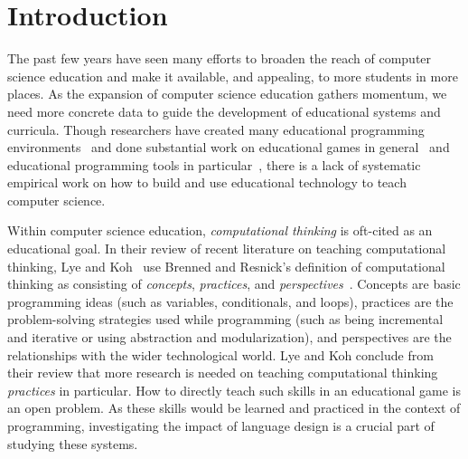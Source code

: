 \documentclass{sig-alternate}
\begin{document}



\section{Introduction}

The past few years have seen many efforts to broaden the reach of computer science education and make it available, and appealing, to more students in more places. As the expansion of computer science education gathers momentum, we need more concrete data to guide the development of educational systems and curricula. Though researchers have created many educational programming environments~\cite{kelleher2005lowering} and done substantial work on educational games in general~\cite{backlund2013educational} and educational programming tools in particular~\cite{salleh2013analysis}, there is a lack of systematic empirical work on how to build and use educational technology to teach computer science.

Within computer science education, \emph{computational thinking} is oft-cited as an educational goal. In their review of recent literature on teaching computational thinking, Lye and Koh~\cite{lye2014review} use Brenned and Resnick's definition of computational thinking as consisting of \emph{concepts}, \emph{practices}, and \emph{perspectives}~\cite{brennan2012new}. Concepts are basic programming ideas (such as variables, conditionals, and loops), practices are the problem-solving strategies used while programming (such as being incremental and iterative or using abstraction and modularization), and perspectives are the relationships with the wider technological world. Lye and Koh conclude from their review that more research is needed on teaching computational thinking \emph{practices} in particular. How to directly teach such skills in an educational game is an open problem. As these skills would be learned and practiced in the context of programming, investigating the impact of language design is a crucial part of studying these systems.
\end{document}
